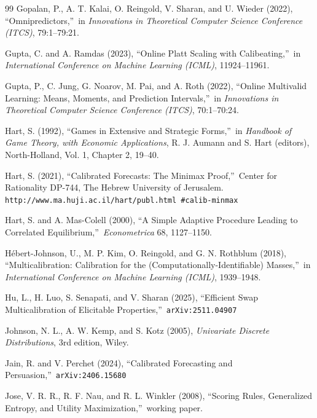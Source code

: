 \documentclass[12pt,a4paper,notitlepage]{article}
\begin{document}
\begin{thebibliography}{99}
\bibitem{} Gopalan, P., A. T. Kalai, O. Reingold, V. Sharan, and U. Wieder
(2022), \textquotedblleft Omnipredictors,\textquotedblright\ in \emph{%
Innovations in Theoretical Computer Science Conference (ITCS)}, 79:1--79:21.

\bibitem{} Gupta, C. and A. Ramdas (2023), \textquotedblleft Online Platt
Scaling with Calibeating,\textquotedblright\ in \emph{International
Conference on Machine Learning (ICML)}, 11924--11961.

\bibitem{} Gupta, P., C. Jung, G. Noarov, M. Pai, and A. Roth (2022),
\textquotedblleft Online Multivalid Learning: Means, Moments, and
Prediction Intervals,\textquotedblright\ in \emph{Innovations in
Theoretical Computer Science Conference (ITCS)}, 70:1--70:24.

\bibitem{} Hart, S. (1992), \textquotedblleft Games in Extensive and
Strategic Forms,\textquotedblright\ in \emph{Handbook of Game Theory, with
Economic Applications}, R. J. Aumann and S. Hart (editors), North-Holland,
Vol. 1, Chapter 2, 19--40.

\bibitem{} Hart, S. (2021), \textquotedblleft Calibrated Forecasts: The
Minimax Proof,\textquotedblright\ Center for Rationality DP-744, The Hebrew
University of Jerusalem. \texttt{http://www.ma.huji.ac.il/hart/publ.html%
\#calib-minmax}

\bibitem{} Hart, S. and A. Mas-Colell (2000), \textquotedblleft A Simple
Adaptive Procedure Leading to Correlated Equilibrium,\textquotedblright\ 
\emph{Econometrica} 68, 1127--1150.

\bibitem{} H\'{e}bert-Johnson, U., M. P. Kim, O. Reingold, and G. N.
Rothblum (2018), \textquotedblleft Multicalibration: Calibration for the
(Computationally-Identifiable) Masses,\textquotedblright\ in \emph{%
International Conference on Machine Learning (ICML)}, 1939--1948.

\bibitem{} Hu, L., H. Luo, S. Senapati, and V. Sharan (2025),
\textquotedblleft Efficient Swap Multicalibration of Elicitable
Properties,\textquotedblright\ \texttt{arXiv:2511.04907}

\bibitem{} Johnson, N. L., A. W. Kemp, and S. Kotz (2005), \emph{Univariate
Discrete Distributions}, 3rd edition, Wiley.

\bibitem{} Jain, R. and V. Perchet (2024), \textquotedblleft Calibrated
Forecasting and Persuasion,\textquotedblright\ \texttt{arXiv:2406.15680}

\bibitem{} Jose, V. R. R., R. F. Nau, and R. L. Winkler (2008),
\textquotedblleft Scoring Rules, Generalized Entropy, and Utility
Maximization,\textquotedblright\ working paper.


\end{thebibliography}
\end{document}
